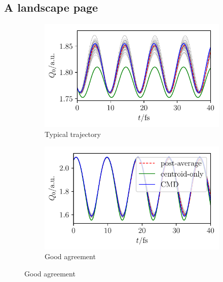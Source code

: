 \documentclass[11pt]{article}
\begin{document}
\newpage
\begin{landscape}
    \subsection{A landscape page}
    \begin{figure} [htp!] %
        \centering
        \begin{subfigure}[b]{10cm}
            \centering
            \includegraphics [scale=1]{norm.pdf}
            \caption{Typical trajectory}
        \end{subfigure}
        \begin{subfigure}[b]{10cm}
            \centering
            \includegraphics [scale=1]{good.pdf}
            \caption{Good agreement}
        \end{subfigure}

\end{figure}
\end{landscape}
\end{document}
